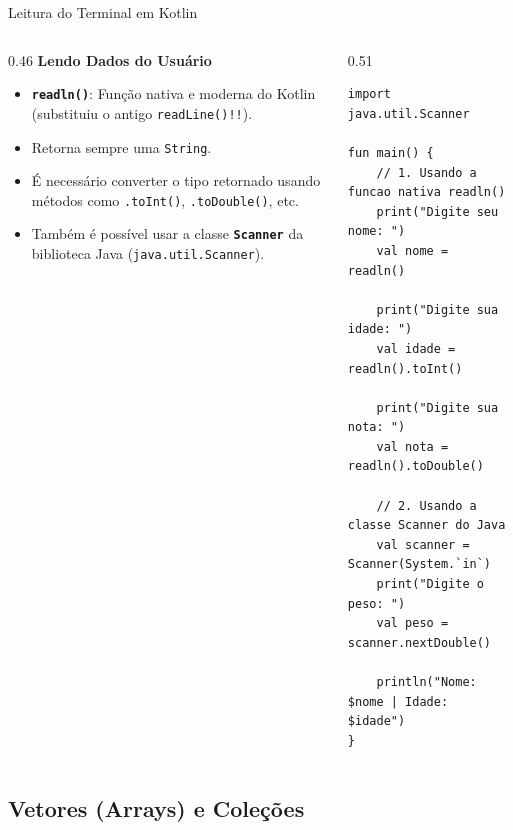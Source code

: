\documentclass[aspectratio=169]{beamer}
\begin{document}
\begin{frame}[fragile]{Leitura do Terminal em Kotlin}
  \begin{columns}[T]
    \begin{column}{0.46\textwidth}
      \textbf{Lendo Dados do Usuário}
      \vspace{0.3em}
      \begin{itemize}\small
        \item \textbf{\texttt{readln()}}: Função nativa e moderna do Kotlin (substituiu o antigo \texttt{readLine()!!}).
        \item Retorna sempre uma \texttt{String}.
        \item É necessário converter o tipo retornado usando métodos como \texttt{.toInt()}, \texttt{.toDouble()}, etc.
        \item Também é possível usar a classe \textbf{\texttt{Scanner}} da biblioteca Java (\texttt{java.util.Scanner}).
      \end{itemize}
    \end{column}
    \begin{column}{0.51\textwidth}
\begin{lstlisting}[style=KotlinStyle]
import java.util.Scanner

fun main() {
    // 1. Usando a funcao nativa readln()
    print("Digite seu nome: ")
    val nome = readln()

    print("Digite sua idade: ")
    val idade = readln().toInt()

    print("Digite sua nota: ")
    val nota = readln().toDouble()

    // 2. Usando a classe Scanner do Java
    val scanner = Scanner(System.`in`)
    print("Digite o peso: ")
    val peso = scanner.nextDouble()

    println("Nome: $nome | Idade: $idade")
}
\end{lstlisting}
    \end{column}
  \end{columns}
\end{frame}

\subsection{Vetores (Arrays) e Coleções}
\end{document}
